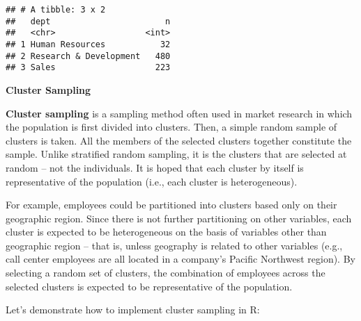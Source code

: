 \documentclass[
]{book}
\newenvironment{Shaded}{\begin{snugshade}}{\end{snugshade}}
\newcommand{\AttributeTok}[1]{\textcolor[rgb]{0.77,0.63,0.00}{#1}}
\newcommand{\CommentTok}[1]{\textcolor[rgb]{0.56,0.35,0.01}{\textit{#1}}}
\newcommand{\DecValTok}[1]{\textcolor[rgb]{0.00,0.00,0.81}{#1}}
\newcommand{\FunctionTok}[1]{\textcolor[rgb]{0.00,0.00,0.00}{#1}}
\newcommand{\NormalTok}[1]{#1}
\newcommand{\OtherTok}[1]{\textcolor[rgb]{0.56,0.35,0.01}{#1}}
\newcommand{\SpecialCharTok}[1]{\textcolor[rgb]{0.00,0.00,0.00}{#1}}
\begin{document}
\begin{verbatim}
## # A tibble: 3 x 2
##   dept                       n
##   <chr>                  <int>
## 1 Human Resources           32
## 2 Research & Development   480
## 3 Sales                    223
\end{verbatim}

\textbf{Cluster Sampling}

\textbf{Cluster sampling} is a sampling method often used in market research in which the population is first divided into clusters. Then, a simple random sample of clusters is taken. All the members of the selected clusters together constitute the sample. Unlike stratified random sampling, it is the clusters that are selected at random -- not the individuals. It is hoped that each cluster by itself is representative of the population (i.e., each cluster is heterogeneous).

For example, employees could be partitioned into clusters based only on their geographic region. Since there is not further partitioning on other variables, each cluster is expected to be heterogeneous on the basis of variables other than geographic region -- that is, unless geography is related to other variables (e.g., call center employees are all located in a company's Pacific Northwest region). By selecting a random set of clusters, the combination of employees across the selected clusters is expected to be representative of the population.

Let's demonstrate how to implement cluster sampling in R:

\begin{Shaded}
\end{Shaded}
\end{document}
